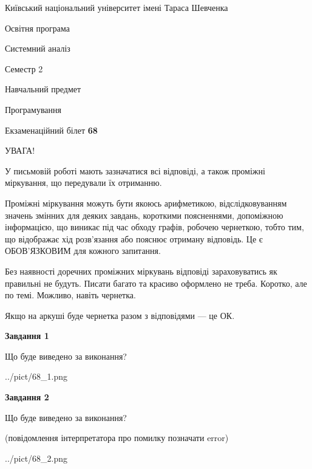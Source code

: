 \documentclass[12pt, ukrainian]{article}
\begin{document}
{{\begin {small}\par
{ \center  Київський національний університет імені Тараса Шевченка \par}
{\parbox {5 cm}{Освітня програма \hfill}{\parbox {7 cm}{Системний аналіз \hfill}}\parbox {6 cm}{\hfill Семестр 2}}\par
{\parbox {5 cm} {Навчальний предмет \hfill}\parbox {7 cm}{Програмування \hfill}\parbox {6cm}{\hfill}\par}\vspace{-7pt} \end{small}}{\center Екзаменаційний білет \No \textbf
{ 68 }\par}}
{
\begin {large}
УВАГА!

У письмовій роботі мають зазначатися всі відповіді, а також проміжні міркування, що передували їх отриманню.

Проміжні міркування можуть бути якоюсь арифметикою, відслідковуванням зна\-чень змінних для деяких завдань,
короткими поясненнями, допоміжною інформацією, що виникає під час обходу графів, робочею чернеткою,
тобто тим, що відображає хід розв’язання або пояснює отриману відповідь.
Це є ОБОВ’ЯЗКОВИМ для кожного запитання.

Без наявності доречних проміжних міркувань відповіді зараховуватись як правиль\-ні не будуть.
Писати багато та красиво оформлено не треба. Коротко, але по темі. Можли\-во, навіть чернетка.

Якщо на аркуші буде чернетка разом з відповідями --- це ОК.

\newpage

{\begin {center}\textbf{Завдання 1}\end {center}}\par
Що буде виведено за виконання?\par
\begin{center}
	{../pict/68_1.png}
\end{center}
\newpage

{\begin {center}\textbf{Завдання 2}\end {center}}\par
Що буде виведено за виконання?\par
 (повідомлення інтерпретатора про помилку позначати error)\par
\begin{center}
	{../pict/68_2.png}
\end{center}
\newpage


\end{large}}
\end{document}
